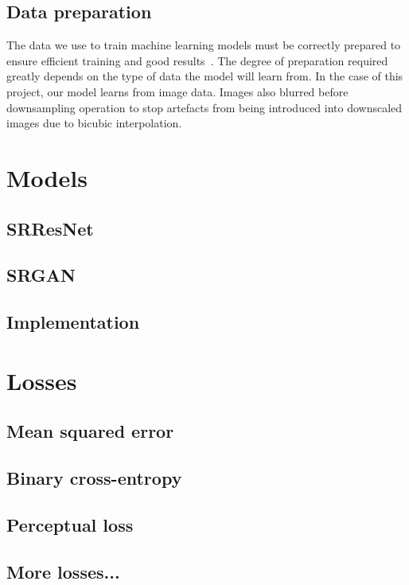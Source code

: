 \subsection{Data preparation}\label{subsec:data_preparation}
The data we use to train machine learning models must be correctly prepared to ensure efficient training and good results~\cite{ref}. The degree of preparation required greatly depends on the type of data the model will learn from. In the case of this project, our model learns from image data. Images also blurred before downsampling operation to stop artefacts from being introduced into downscaled images due to bicubic interpolation.

\section{Models}

\subsection{SRResNet}

\subsection{SRGAN}

\subsection{Implementation}

\section{Losses}

\subsection{Mean squared error}

\subsection{Binary cross-entropy}

\subsection{Perceptual loss}

\subsection{More losses...}

